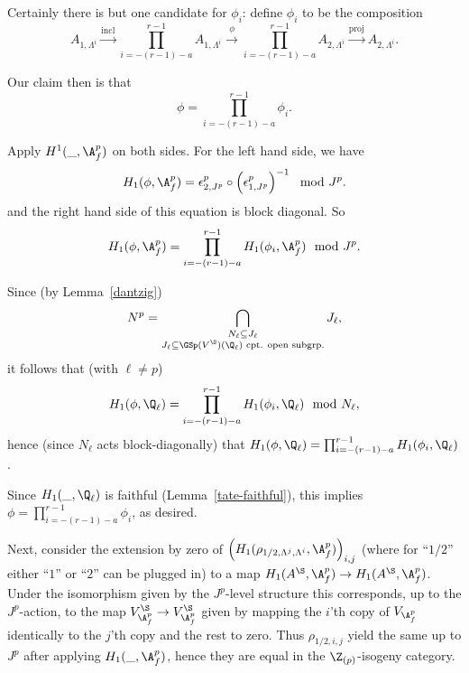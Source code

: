 \documentclass[a4paper]{scrartcl} %
\numberwithin{equation}{section}
\begin{document}
\begin{Proof}
  Certainly there is but one candidate for $\phi_i$: define $\phi_i$ to be the composition
  \begin{equation*}
    A_{1,\Lambda^i}\xrightarrow{\mathrm{incl}} \prod_{i=-(r-1)-a}^{r-1}A_{1,\Lambda^i} \xrightarrow{\phi} \prod_{i=-(r-1)-a}^{r-1}A_{2,\Lambda^i} \xrightarrow{\mathrm{proj}} A_{2,\Lambda^i}.
  \end{equation*}

  Our claim then is that
  \begin{equation*}
    \phi = \prod_{i=-(r-1)-a}^{r-1}\phi_i.
  \end{equation*}

  Apply $H^1(\_,\A_f^p)$ on both sides. For the left hand side, we have
  \begin{equation*}
    H_1(\phi,\A_f^p) = \epsilon_{2,J^p}^p\circ \left(\epsilon_{1,J^p}^p\right)^{-1}   \mod{J^p}.
  \end{equation*}
  and the right hand side of this equation is block diagonal. So
  \begin{equation*}
    H_1(\phi,\A_f^p) = \prod_{i=-(r-1)-a}^{r-1}H_1(\phi_i,\A_f^p) \mod{J^p}.
  \end{equation*}

  Since (by Lemma~\ref{dantzig})
  \begin{equation*}
    N^p = \bigcap_{\substack{N_\ell\subseteq J_\ell\\ J_\ell\subseteq \GSp(V^\S)(\Q_\ell)\text{ cpt. open subgrp.}}}J_\ell,
  \end{equation*}
  it follows that (with $\ell\ne p$)
  \begin{equation*}
    H_1(\phi,\Q_\ell) = \prod_{i=-(r-1)-a}^{r-1}H_1(\phi_i,\Q_\ell) \mod{N_\ell},
  \end{equation*}
  hence (since $N_\ell$ acts block-diagonally) that $H_1(\phi,\Q_\ell)= \prod_{i=-(r-1)-a}^{r-1}H_1(\phi_i,\Q_\ell)$.

  Since $H_1(\_,\Q_\ell)$ is faithful (Lemma~\ref{tate-faithful}), this implies $\phi=\prod_{i=-(r-1)-a}^{r-1}\phi_i$, as desired.

  Next, consider the extension by zero of $\left(H_1(\rho_{1/2,\Lambda^j,\Lambda^i},\A_f^p)\right)_{i,j}$ (where for ``$1/2$'' either ``$1$'' or ``$2$'' can be plugged in) to a map $H_1(A^\S,\A_f^p)\to H_1(A^\S,\A_f^p)$. Under the isomorphism given by the $J^p$-level structure this corresponds, up to the $J^p$-action, to the map $V^\S_{\A_f^p}\to V^\S_{\A_f^p}$ given by mapping the $i$'th copy of $V_{\A_f^p}$ identically to the $j$'th copy and the rest to zero. Thus $\rho_{1/2,i,j}$ yield the same up to $J^p$ after applying $H_1(\_,\A_f^p)$, hence they are equal in the $\Z_{(p)}$-isogeny category.


\end{Proof}
\end{document}
